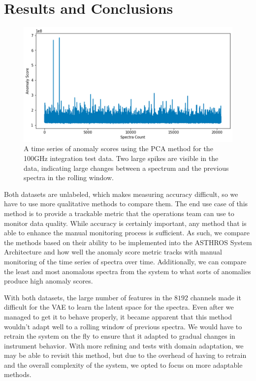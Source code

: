 \section{Results and Conclusions}
\label{spectra/sec:results}
\begin{figure}[b]
    \centering
    \includegraphics[width=0.5\linewidth]{figs/spectra/asthros_timeseries.png}
    \caption[Anomaly Score Over Time During the 100GHz Integration Test]{A time series of anomaly scores using the PCA method for the 100GHz integration test data. Two large spikes are visible in the data, indicating large changes between a spectrum and the previous spectra in the rolling window.}
    \label{spectra/fig:timeseries}
\end{figure}

Both datasets are unlabeled, which makes measuring accuracy difficult, so we have to use more qualitative methods to compare them.
The end use case of this method is to provide a trackable metric that the operations team can use to monitor data quality.
While accuracy is certainly important, any method that is able to enhance the manual monitoring process is sufficient. 
As such, we compare the methods based on their ability to be implemented into the ASTHROS System Architecture and how well the anomaly score metric tracks with manual monitoring of the time series of spectra over time. 
Additionally, we can compare the least and most anomalous spectra from the system to what sorts of anomalies produce high anomaly scores. 

With both datasets, the large number of features in the $8192$ channels made it difficult for the VAE to learn the latent space for the spectra. 
Even after we managed to get it to behave properly, it became apparent that this method wouldn't adapt well to a rolling window of previous spectra. 
We would have to retrain the system on the fly to ensure that it adapted to gradual changes in instrument behavior.
With more refining and tests with domain adaptation, we may be able to revisit this method, but due to the overhead of having to retrain and the overall complexity of the system, we opted to focus on more adaptable methods. 


